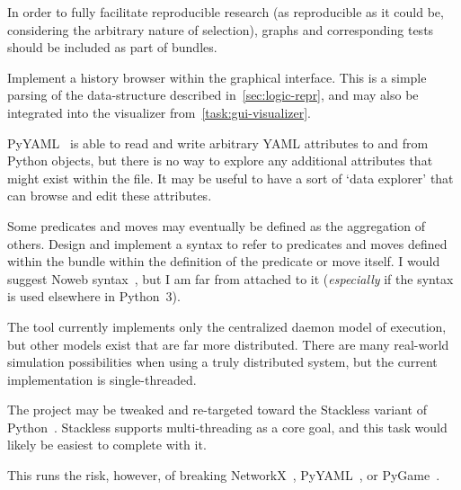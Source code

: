 \begin{task}
  \label{task:bundle-graphs}
  In order to fully facilitate reproducible research
    (as reproducible as it could be,
      considering the arbitrary nature of selection),
    graphs and corresponding tests should be included as part of bundles.
\end{task}

\begin{task}
  \label{task:save-history}
  Implement a history browser within the graphical interface.
  This is a simple parsing of the data-structure described in~\autoref{sec:logic-repr},
    and may also be integrated into the visualizer from~\autoref{task:gui-visualizer}.
\end{task}

\begin{task}
  \label{task:arbitrary-attributes}
  PyYAML~\autocite{pyyaml} is able to read and write arbitrary YAML
  attributes to and from Python objects, but there is no way to explore
  any additional attributes that might exist within the file.
  It may be useful to have a sort of \enquote*{data explorer} that can
    browse and edit these attributes.
\end{task}

\begin{task}
  \label{task:magical-references}
  Some predicates and moves may eventually be defined as the aggregation of others.
  Design and implement a syntax to refer to predicates and moves defined within the bundle
    within the definition of the predicate or move itself.
  I would suggest Noweb syntax~\autocite{noweb}, but I am far from attached to it
    (\emph{especially} if the syntax is used elsewhere in Python~3).
\end{task}

\begin{task}
  \label{task:stackless}
  The tool currently implements only the centralized daemon model of execution,
    but other models exist that are far more distributed.
  There are many real-world simulation possibilities when using a truly distributed system,
    but the current implementation is single-threaded.

  The project may be tweaked and re-targeted toward the Stackless variant of Python~\autocite{stackless}.
  Stackless supports multi-threading as a core goal, and this task would likely be easiest to complete with it.

  This runs the risk, however, of breaking NetworkX~\autocite{hagberg:networkx}, PyYAML~\autocite{pyyaml}, or PyGame~\autocite{pygame}.
\end{task}

